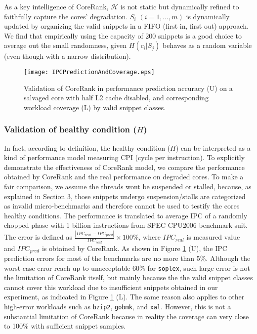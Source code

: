 As a key intelligence of CoreRank, $\mathcal{H}$ is not static but dynamically refined to faithfully capture the cores' degradation.  $S_i$ $(i=1, \ldots, m)$ is dynamically updated by organizing the valid snippets in a FIFO (first in, first out) approach. We find that empirically using the capacity of 200 snippets  is a good choice to average out the small randomness, given $H(c_i|S_j)$ behaves as a random variable (even though with a narrow distribution).

\begin{figure}[t]
  \centering
  \texttt{[image: IPCPredictionAndCoverage.eps]}\\
  \caption{Validation of CoreRank in performance prediction accuracy (U) on a salvaged core with half L2 cache disabled, and corresponding workload coverage (L) by valid snippet classes.}\label{prederror}
\end{figure}


\subsubsection{Validation of healthy condition ($H$)}
In fact, according to definition, the healthy condition ($H$) can be interpreted as a kind of performance model measuring CPI (cycle per instruction).  To explicitly demonstrate the effectiveness of CoreRank model, we compare the performance obtained by CoreRank and the real performance on degraded cores. To make a fair comparison, we assume the threads wont be suspended or stalled, because, as explained in Section 3, those snippets undergo suspension/stalls are categorized as invalid micro-benchmarks and therefore cannot be used to testify the cores healthy conditions. The performance is translated to average IPC of a randomly chopped  phase with 1 billion instructions from SPEC CPU2006 benchmark suit. The error is defined as $\frac{ |IPC_{real}-IPC_{pred}|}{IPC_{real}}\times 100\%$, where $IPC_{real}$ is  measured value and $IPC_{pred}$ is obtained by CoreRank.  As shown in Figure \ref{prederror} (U),  the IPC prediction errors for most of the benchmarks are no more than 5\%.  Although the worst-case error reach up to unacceptable 60\% for \texttt{soplex}, such large error is not the limitation of CoreRank itself, but mainly because the the valid snippet classes cannot cover this workload due to insufficient snippets obtained in our experiment, as indicated in Figure \ref{prederror} (L).  The same reason also applies to other high-error workloads such as \texttt{bzip2}, \texttt{gobmk}, and \texttt{xal}. However, this is not a substantial limitation of CoreRank because in reality the coverage can very close to 100\% with sufficient snippet samples.  


